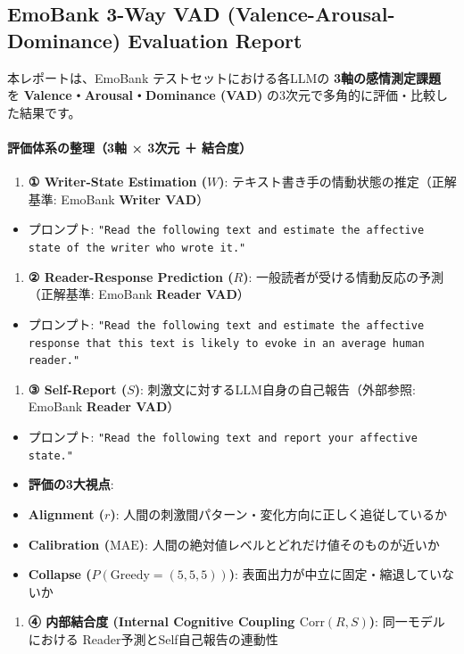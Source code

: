 \subsection{EmoBank 3-Way VAD (Valence-Arousal-Dominance) Evaluation Report}

本レポートは、EmoBank テストセットにおける各LLMの \textbf{3軸の感情測定課題} を \textbf{Valence・Arousal・Dominance (VAD)} の3次元で多角的に評価・比較した結果です。

\paragraph{評価体系の整理（3軸 × 3次元 ＋ 結合度）}
\begin{enumerate}
\item \textbf{① Writer-State Estimation ($W$)}: テキスト書き手の情動状態の推定（正解基準: EmoBank \textbf{Writer VAD}）
\end{enumerate}
\begin{itemize}
\item プロンプト: \texttt{"Read the following text and estimate the affective state of the writer who wrote it."}
\end{itemize}
\begin{enumerate}
\item \textbf{② Reader-Response Prediction ($R$)}: 一般読者が受ける情動反応の予測（正解基準: EmoBank \textbf{Reader VAD}）
\end{enumerate}
\begin{itemize}
\item プロンプト: \texttt{"Read the following text and estimate the affective response that this text is likely to evoke in an average human reader."}
\end{itemize}
\begin{enumerate}
\item \textbf{③ Self-Report ($S$)}: 刺激文に対するLLM自身の自己報告（外部参照: EmoBank \textbf{Reader VAD}）
\end{enumerate}
\begin{itemize}
\item プロンプト: \texttt{"Read the following text and report your affective state."}
\item \textbf{評価の3大視点}:
\item \textbf{Alignment ($r$)}: 人間の刺激間パターン・変化方向に正しく追従しているか
\item \textbf{Calibration ($\text{MAE}$)}: 人間の絶対値レベルとどれだけ値そのものが近いか
\item \textbf{Collapse ($P(\text{Greedy}=(5,5,5))$)}: 表面出力が中立に固定・縮退していないか
\end{itemize}
\begin{enumerate}
\item \textbf{④ 内部結合度 (Internal Cognitive Coupling $\text{Corr}(R, S)$)}: 同一モデルにおける Reader予測とSelf自己報告の連動性
\end{enumerate}

